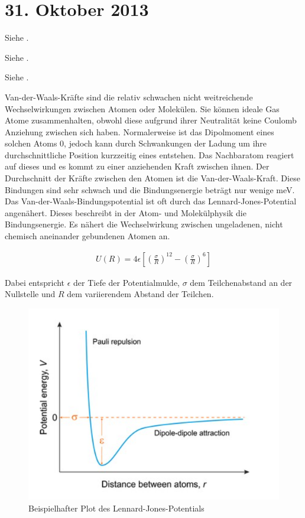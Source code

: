 \section{31. Oktober 2013}

\label{q:70}

Siehe .

\label{q:71}

Siehe .

\label{q:72}

Siehe .

\label{q:73}

Van-der-Waals-Kräfte sind die relativ schwachen nicht weitreichende Wechselwirkungen zwischen Atomen oder Molekülen. Sie können ideale Gas Atome zusammenhalten, obwohl diese aufgrund ihrer Neutralität keine Coulomb Anziehung zwischen sich haben.
Normalerweise ist das Dipolmoment eines solchen Atoms 0, jedoch kann durch Schwankungen der Ladung um ihre durchschnittliche Position kurzzeitig eines entstehen. 
Das Nachbaratom reagiert auf dieses und es kommt zu einer anziehenden Kraft zwischen ihnen. Der Durchschnitt der Kräfte zwischen den Atomen ist die Van-der-Waals-Kraft. Diese Bindungen sind sehr schwach und die Bindungsenergie beträgt nur wenige \si{meV}.
Das Van-der-Waals-Bindungspotential ist oft durch das Lennard-Jones-Potential angenähert. Dieses beschreibt in der Atom- und Molekülphysik die Bindungsenergie. Es nähert die Wechselwirkung zwischen ungeladenen, nicht chemisch aneinander gebundenen Atomen an.

\begin{align}
    U(R) = 4\epsilon\left[\left(\frac{\sigma}{R}\right)^{12} - \left(\frac{\sigma}{R}\right)^6\right]
\end{align}

Dabei entspricht $\epsilon$ der Tiefe der Potentialmulde, $\sigma$ dem Teilchenabstand an der Nullstelle und $R$ dem variierendem Abstand der Teilchen.

\begin{figure}[H]
    \includegraphics[width=0.8\linewidth]{resources/31-10-2013/lennard.PNG}
    \caption{Beispielhafter Plot des Lennard-Jones-Potentials}
\end{figure}

